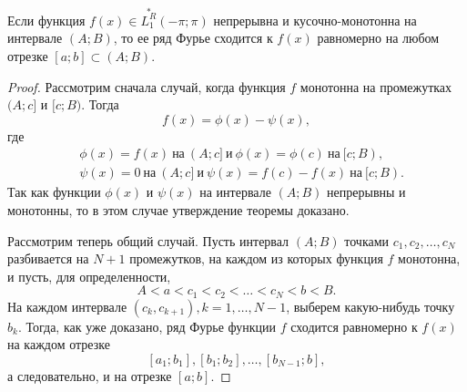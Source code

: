 \begin{thm}  \label{ch18thm4}
Если функция $f(x) \in \overset{*}{L^{R}_1}(-\pi;\pi)$ непрерывна и кусочно-монотонна на интервале $(A;B)$, то ее ряд Фурье сходится к $f(x)$ равномерно на любом отрезке $[a;b] \subset (A;B)$.
\end{thm}
\begin{proof}
Рассмотрим сначала случай, когда функция $f$ монотонна на промежутках $(A;c]$ и $[c;B)$. Тогда
$$
f(x) = \phi(x) - \psi(x),
$$
где
\begin{align*}
&\phi(x) = f(x)\ \text{на}\ (A;c]\ \text{и}\ \phi(x) = \phi(c)\ \text{на}\ [c;B),\\
&\psi(x) = 0   \ \text{на}\ (A;c]\ \text{и}\ \psi(x) = f(c) - f(x) \ \text{на}\ [c;B).
\end{align*}
Так как функции $\phi(x)$ и $\psi(x)$ на интервале $(A;B)$ непрерывны и монотонны, то в этом случае утверждение теоремы доказано.

Рассмотрим теперь общий случай. Пусть интервал $(A;B)$ точками $c_1, c_2, \ldots, c_N$ разбивается на $N + 1$ промежутков, на каждом из которых функция $f$ монотонна, и пусть, для определенности,
$$
A < a < c_1 < c_2 < \ldots < c_N < b < B.
$$
На каждом интервале $(c_k, c_{k+1}), k = 1, \ldots, N - 1$, выберем какую-нибудь точку $b_k$. Тогда, как уже доказано, ряд Фурье функции $f$ сходится равномерно к $f(x)$ на каждом отрезке
$$
[a_1; b_1], [b_1; b_2],\ldots, [b_{N-1};b],
$$
а следовательно, и на отрезке $[a;b]$.
\end{proof}